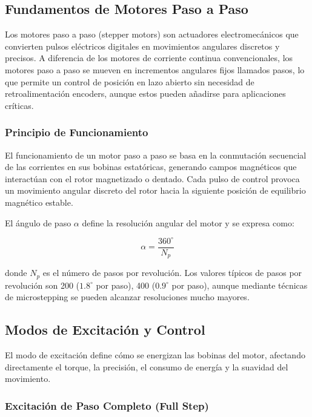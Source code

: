 \subsection{Fundamentos de Motores Paso a Paso}

Los motores paso a paso (stepper motors) son actuadores electromecánicos que convierten pulsos eléctricos digitales en movimientos angulares discretos y precisos. A diferencia de los motores de corriente continua convencionales, los motores paso a paso se mueven en incrementos angulares fijos llamados pasos, lo que permite un control de posición en lazo abierto sin necesidad de retroalimentación encoders, aunque estos pueden añadirse para aplicaciones críticas.

\subsubsection{Principio de Funcionamiento}

El funcionamiento de un motor paso a paso se basa en la conmutación secuencial de las corrientes en sus bobinas estatóricas, generando campos magnéticos que interactúan con el rotor magnetizado o dentado. Cada pulso de control provoca un movimiento angular discreto del rotor hacia la siguiente posición de equilibrio magnético estable.

El ángulo de paso $\alpha$ define la resolución angular del motor y se expresa como:

\begin{equation}
\alpha = \frac{360^\circ}{N_p}
\end{equation}

donde $N_p$ es el número de pasos por revolución. Los valores típicos de pasos por revolución son 200 ($1.8^\circ$ por paso), 400 ($0.9^\circ$ por paso), aunque mediante técnicas de microstepping se pueden alcanzar resoluciones mucho mayores.

\subsection{Modos de Excitación y Control}

El modo de excitación define cómo se energizan las bobinas del motor, afectando directamente el torque, la precisión, el consumo de energía y la suavidad del movimiento.

\subsubsection{Excitación de Paso Completo (Full Step)}

